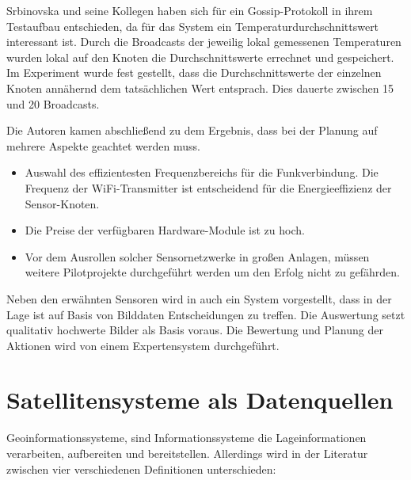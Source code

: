 Srbinovska und seine Kollegen haben sich für ein Gossip-Protokoll in ihrem Testaufbau entschieden, da für das System ein Temperaturdurchschnittswert interessant ist. Durch die Broadcasts der jeweilig lokal gemessenen Temperaturen wurden lokal auf den Knoten die Durchschnittswerte errechnet und gespeichert. Im Experiment wurde fest gestellt, dass die Durchschnittswerte der einzelnen Knoten annähernd dem tatsächlichen Wert entsprach. Dies dauerte zwischen 15 und 20 Broadcasts.\cite{jour:Srbinovska2014}

Die Autoren kamen abschließend zu dem Ergebnis, dass bei der Planung auf mehrere Aspekte geachtet werden muss.\cite{jour:Srbinovska2014}
\begin{itemize}
	\item Auswahl des effizientesten Frequenzbereichs für die Funkverbindung. Die Frequenz der WiFi-Transmitter ist entscheidend für die Energieeffizienz der Sensor-Knoten.
	\item Die Preise der verfügbaren Hardware-Module ist zu hoch.
	\item Vor dem Ausrollen solcher Sensornetzwerke in großen Anlagen, müssen weitere Pilotprojekte durchgeführt werden um den Erfolg nicht zu gefährden.
\end{itemize}

Neben den erwähnten Sensoren wird in \cite{jour:Romeo2013} auch ein System vorgestellt, dass in der Lage ist auf Basis von Bilddaten Entscheidungen zu treffen. Die Auswertung setzt qualitativ hochwerte Bilder als Basis voraus. Die Bewertung und Planung der Aktionen wird von einem Expertensystem durchgeführt.

\section{Satellitensysteme als Datenquellen}

Geoinformationssysteme, sind Informationssysteme die Lageinformationen verarbeiten, aufbereiten und bereitstellen. Allerdings wird in der Literatur zwischen vier verschiedenen Definitionen unterschieden:\cite{book:Carosio2006}

